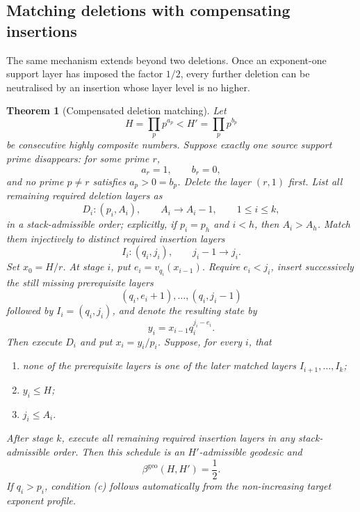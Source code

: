 \documentclass[11pt]{article}
\numberwithin{equation}{section}
\theoremstyle{blueplain}
\newtheorem{theorem}{Theorem}[section]
\theoremstyle{bluedef}
\newcommand{\vpp}[2]{v_{#1}(#2)}
\newcommand{\betageo}{\beta^{\mathrm{geo}}}
\begin{document}
\subsection{Matching deletions with compensating insertions}

The same mechanism extends beyond two deletions.  Once an exponent-one support layer has imposed the factor $1/2$, every further deletion can be neutralised by an insertion whose layer level is no higher.

\begin{theorem}[Compensated deletion matching]
\label{thm:compensated-matching}
Let
\[
 H=\prod_p p^{a_p}<H'=\prod_p p^{b_p}
\]
be consecutive highly composite numbers.  Suppose exactly one source support prime disappears: for some prime $r$,
\[
 a_r=1,
 \qquad
 b_r=0,
\]
and no prime $p\ne r$ satisfies $a_p>0=b_p$.  Delete the layer $(r,1)$ first.  List all remaining required deletion layers as
\[
 D_i:(p_i,A_i),\qquad A_i\to A_i-1,
 \qquad 1\le i\le k,
\]
in a stack-admissible order; explicitly, if $p_i=p_h$ and $i<h$, then $A_i>A_h$.  Match them injectively to distinct required insertion layers
\[
 I_i:(q_i,j_i),\qquad j_i-1\to j_i.
\]
Set $x_0=H/r$.  At stage $i$, put $e_i=\vpp{q_i}{x_{i-1}}$.  Require $e_i<j_i$, insert successively the still missing prerequisite layers
\[
 (q_i,e_i+1),\ldots,(q_i,j_i-1)
\]
followed by $I_i=(q_i,j_i)$, and denote the resulting state by
\[
 y_i=x_{i-1}q_i^{j_i-e_i}.
\]
Then execute $D_i$ and put $x_i=y_i/p_i$.  Suppose, for every $i$, that
\begin{enumerate}[label=\textup{(\alph*)}]
\item none of the prerequisite layers is one of the later matched layers $I_{i+1},\ldots,I_k$;
\item $y_i\le H$;
\item $j_i\le A_i$.
\end{enumerate}
After stage $k$, execute all remaining required insertion layers in any stack-admissible order.  Then this schedule is an $H'$-admissible geodesic and
\begin{equation}
 \boxed{\betageo(H,H')=\frac12.}
 \label{eq:matching-equality}
\end{equation}
If $q_i>p_i$, condition (c) follows automatically from the non-increasing target exponent profile.
\end{theorem}
\end{document}
